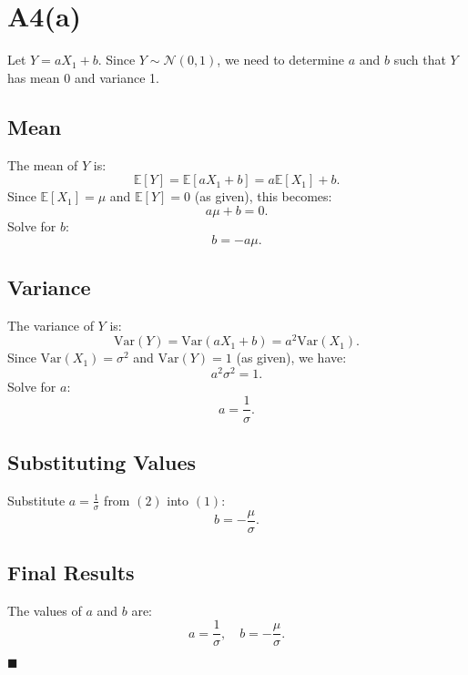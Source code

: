 \documentclass{article}
\begin{document}
\section*{A4(a)}

Let \( Y = aX_1 + b \). Since \( Y \sim \mathcal{N}(0, 1) \), we need to determine \( a \) and \( b \) such that \( Y \) has mean 0 and variance 1.

\subsection*{Mean}
The mean of \( Y \) is:
\[
\mathbb{E}[Y] = \mathbb{E}[aX_1 + b] = a\mathbb{E}[X_1] + b.
\]
Since \( \mathbb{E}[X_1] = \mu \) and \( \mathbb{E}[Y] = 0 \) (as given), this becomes:
\[
a\mu + b = 0.
\]
Solve for \( b \):
\[
b = -a\mu. \tag{1}
\]

\subsection*{Variance}
The variance of \( Y \) is:
\[
\text{Var}(Y) = \text{Var}(aX_1 + b) = a^2 \text{Var}(X_1).
\]
Since \( \text{Var}(X_1) = \sigma^2 \) and \( \text{Var}(Y) = 1 \) (as given), we have:
\[
a^2 \sigma^2 = 1.
\]
Solve for \( a \):
\[
a = \frac{1}{\sigma}. \tag{2}
\]

\subsection*{Substituting Values}
Substitute \( a = \frac{1}{\sigma} \) from \((2)\) into \((1)\):
\[
b = -\frac{\mu}{\sigma}.
\]

\subsection*{Final Results}
The values of \( a \) and \( b \) are:
\[
a = \frac{1}{\sigma}, \quad b = -\frac{\mu}{\sigma}.
\]

\hfill\(\blacksquare\)
\end{document}
